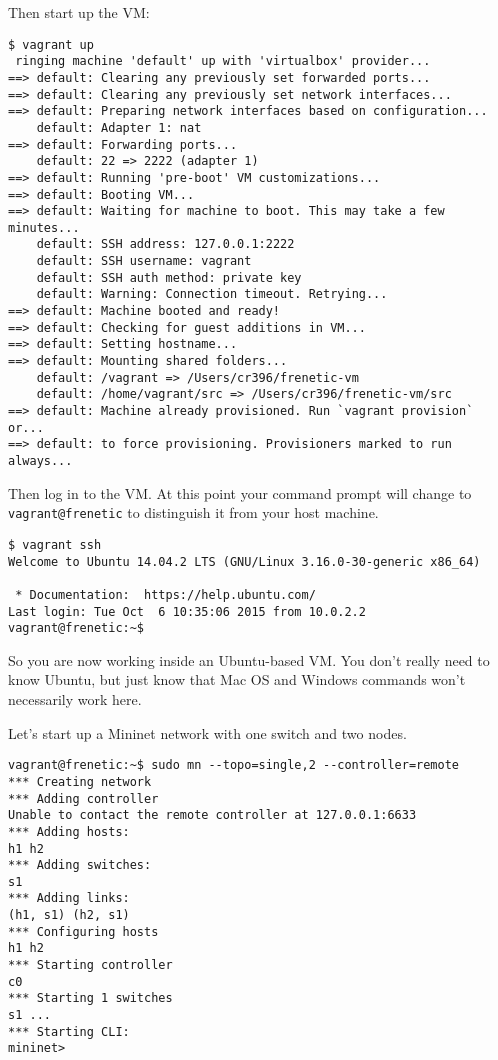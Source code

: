 Then start up the VM:

\begin{lstlisting}[style=BashInputStyle]
 $ vagrant up
 ringing machine 'default' up with 'virtualbox' provider...
==> default: Clearing any previously set forwarded ports...
==> default: Clearing any previously set network interfaces...
==> default: Preparing network interfaces based on configuration...
    default: Adapter 1: nat
==> default: Forwarding ports...
    default: 22 => 2222 (adapter 1)
==> default: Running 'pre-boot' VM customizations...
==> default: Booting VM...
==> default: Waiting for machine to boot. This may take a few minutes...
    default: SSH address: 127.0.0.1:2222
    default: SSH username: vagrant
    default: SSH auth method: private key
    default: Warning: Connection timeout. Retrying...
==> default: Machine booted and ready!
==> default: Checking for guest additions in VM...
==> default: Setting hostname...
==> default: Mounting shared folders...
    default: /vagrant => /Users/cr396/frenetic-vm
    default: /home/vagrant/src => /Users/cr396/frenetic-vm/src
==> default: Machine already provisioned. Run `vagrant provision` or...
==> default: to force provisioning. Provisioners marked to run always...
\end{lstlisting}

Then log in to the VM.  At this point your command prompt will change to {\tt vagrant@frenetic} to distinguish it
from your host machine.

\begin{lstlisting}[style=BashInputStyle]
 $ vagrant ssh
Welcome to Ubuntu 14.04.2 LTS (GNU/Linux 3.16.0-30-generic x86_64)

 * Documentation:  https://help.ubuntu.com/
Last login: Tue Oct  6 10:35:06 2015 from 10.0.2.2
vagrant@frenetic:~$ 
\end{lstlisting}

So you are now working inside an Ubuntu-based VM.  You don't really need to know Ubuntu, but just know that Mac OS and Windows commands won't necessarily work here.  

Let's start up a Mininet network with one switch and two nodes.

\begin{lstlisting}[style=BashInputStyle]
vagrant@frenetic:~$ sudo mn --topo=single,2 --controller=remote
*** Creating network
*** Adding controller
Unable to contact the remote controller at 127.0.0.1:6633
*** Adding hosts:
h1 h2
*** Adding switches:
s1
*** Adding links:
(h1, s1) (h2, s1)
*** Configuring hosts
h1 h2
*** Starting controller
c0
*** Starting 1 switches
s1 ...
*** Starting CLI:
mininet>
\end{lstlisting}

